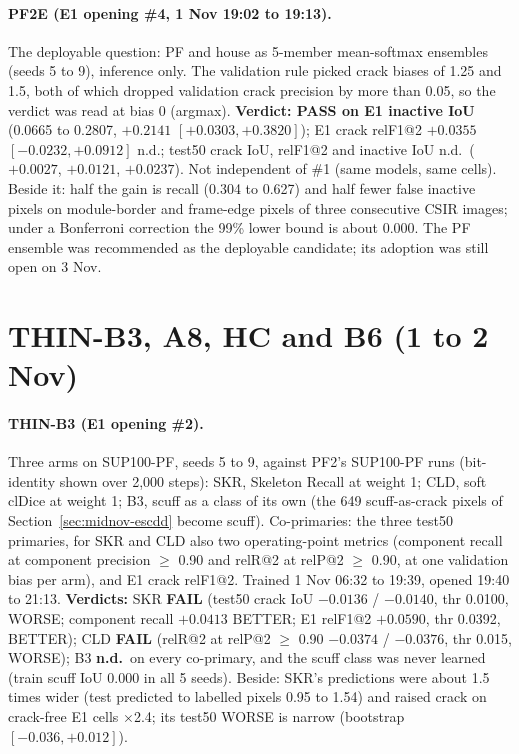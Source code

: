 \paragraph{PF2E (E1 opening \#4, 1 Nov 19:02 to 19:13).} The deployable question: PF and house as 5-member mean-softmax ensembles
(seeds 5 to 9), inference only. The validation rule picked crack biases of 1.25 and 1.5, both of which dropped validation crack
precision by more than 0.05, so the verdict was read at bias 0 (argmax). \textbf{Verdict: PASS on E1 inactive IoU} (0.0665 to 0.2807,
$+0.2141$ $[+0.0303, +0.3820]$); E1 crack relF1@2 $+0.0355$ $[-0.0232, +0.0912]$ n.d.; test50 crack IoU, relF1@2 and inactive IoU
n.d.\ ($+0.0027$, $+0.0121$, $+0.0237$). Not independent of \#1 (same models, same cells). Beside it: half the gain is recall (0.304
to 0.627) and half fewer false inactive pixels on module-border and frame-edge pixels of three consecutive CSIR images; under a Bonferroni correction
the 99\% lower bound is about 0.000. The PF ensemble was recommended as the deployable candidate; its adoption was still open on
3 Nov.

\section{THIN-B3, A8, HC and B6 (1 to 2 Nov)}\label{sec:midnov-thin}

\paragraph{THIN-B3 (E1 opening \#2).} Three arms on SUP100-PF, seeds 5 to 9, against PF2's SUP100-PF runs (bit-identity shown over
2,000 steps): SKR, Skeleton Recall \citep{kirchhoff2024skeletonrecall} at weight 1; CLD, soft clDice \citep{shit2021cldice}
at weight 1; B3, scuff as a class of its own (the 649 scuff-as-crack pixels of Section~\ref{sec:midnov-escdd} become scuff).
Co-primaries: the three test50 primaries, for SKR and CLD also two operating-point metrics (component recall at component precision
$\geq$ 0.90 and relR@2 at relP@2 $\geq$ 0.90, at one validation bias per arm), and E1 crack relF1@2. Trained 1 Nov 06:32 to 19:39,
opened 19:40 to 21:13. \textbf{Verdicts:} SKR \textbf{FAIL} (test50 crack IoU $-0.0136$ / $-0.0140$, thr 0.0100, WORSE; component
recall $+0.0413$ BETTER; E1 relF1@2 $+0.0590$, thr 0.0392, BETTER); CLD \textbf{FAIL} (relR@2 at relP@2 $\geq$ 0.90 $-0.0374$ /
$-0.0376$, thr 0.015, WORSE); B3 \textbf{n.d.}\ on every co-primary, and the scuff class was never learned (train scuff IoU 0.000 in
all 5 seeds). Beside: SKR's predictions were about 1.5 times wider (test predicted to labelled pixels 0.95 to 1.54) and raised crack
on crack-free E1 cells $\times$2.4; its test50 WORSE is narrow (bootstrap $[-0.036, +0.012]$).

